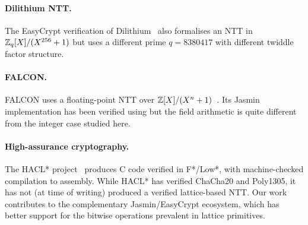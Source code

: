 \paragraph{Dilithium NTT.}
The EasyCrypt verification of Dilithium~\cite{Barbosa2021} also formalises
an NTT in $\mathbb{Z}_q[X]/(X^{256}+1)$ but uses a different prime $q = 8380417$ with
different twiddle factor structure.

\paragraph{FALCON.}
FALCON uses a floating-point NTT over $\mathbb{Z}[X]/(X^n+1)$~\cite{Fouque2018}.
Its Jasmin implementation has been verified using \easycrypt{} but the
field arithmetic is quite different from the integer case studied here.

\paragraph{High-assurance cryptography.}
The HACL* project~\cite{Zinzindohoue2017} produces C code verified in
F*/Low*, with machine-checked compilation to assembly.  While HACL* has
verified ChaCha20 and Poly1305, it has not (at time of writing) produced a
verified lattice-based NTT.  Our work contributes to the complementary
Jasmin/EasyCrypt ecosystem, which has better support for the bitwise
operations prevalent in lattice primitives.
